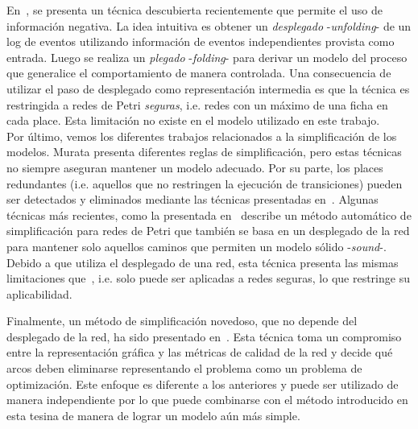 En~\cite{LeonRCHH15}, se presenta un técnica descubierta recientemente que permite el uso de información negativa.
La idea intuitiva es obtener un \textit{desplegado} -\textit{unfolding}- de un log de eventos utilizando 
información de eventos independientes provista como entrada. Luego se realiza un \textit{plegado} -\textit{folding}-
para derivar un modelo del proceso que generalice el comportamiento de manera controlada.
Una consecuencia de utilizar el paso de desplegado como representación intermedia es que la técnica es restringida
a redes de Petri \textit{seguras}, i.e. redes con un máximo de una ficha en cada place. Esta limitación no existe
en el modelo utilizado en este trabajo.\\


Por último, vemos los diferentes trabajos relacionados a la simplificación de los modelos.
Murata presenta diferentes reglas de simplificación\cite{Murata89}, pero estas técnicas no siempre aseguran mantener
un modelo adecuado.
Por su parte, los places redundantes (i.e. aquellos que no restringen la ejecución de transiciones) pueden ser detectados
y eliminados mediante las técnicas presentadas en~\cite{ColomS89a}. 
Algunas técnicas más recientes, como la presentada en~\cite{FahlandA13} describe un método automático de simplificación para
redes de Petri que también se basa en un desplegado de la red para mantener solo aquellos caminos que permiten un modelo
sólido -\textit{sound}-. Debido a que utiliza el desplegado de una red, esta técnica presenta las mismas limitaciones
que~\cite{LeonRCHH15}, i.e. solo puede ser aplicadas a redes seguras, lo que restringe su aplicabilidad.

Finalmente, un método de simplificación novedoso, que no depende del desplegado de la red, ha sido presentado en~\cite{PedroCC15}.
Esta técnica toma un compromiso entre la representación gráfica y las métricas de calidad de la red y decide qué arcos
deben eliminarse representando el problema como un problema de optimización. Este enfoque es diferente a los anteriores
y puede ser utilizado de manera independiente por lo que puede combinarse con el método introducido en esta tesina
de manera de lograr un modelo aún más simple.


